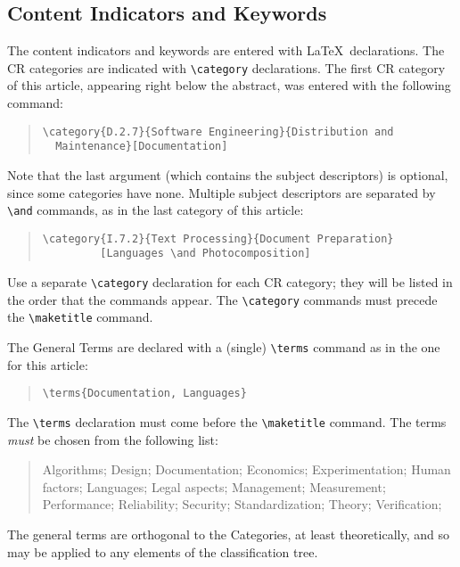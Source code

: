 \documentclass[hyperref]{acmtrans2e}
\begin{document}
\subsection{Content Indicators and Keywords}

The content indicators and keywords are entered with \LaTeX\ 
declarations.  The CR categories are indicated with \verb|\category|
declarations.  The first CR category of this article, appearing
right below the abstract, was entered with the following command:
\begin{quote}
\begin{verbatim}
\category{D.2.7}{Software Engineering}{Distribution and 
  Maintenance}[Documentation]
\end{verbatim}
\end{quote}
Note that the last argument (which contains the subject descriptors)
is optional, since some categories have none.  Multiple subject descriptors
are separated by \verb|\and| commands, as in the last category of
this article:
\begin{quote}
\begin{verbatim}
\category{I.7.2}{Text Processing}{Document Preparation}
         [Languages \and Photocomposition]
\end{verbatim}
\end{quote}
Use a separate \verb|\category| declaration for each CR category;
they will be listed in the order that the commands appear.  The
\verb|\category| commands must precede the \verb|\maketitle|
command.

The General Terms are declared with a (single) \verb|\terms|
command as in the one for this article:
\begin{quote}
\begin{verbatim}
\terms{Documentation, Languages}
\end{verbatim}
\end{quote}
The \verb|\terms| declaration must come before the \verb|\maketitle|
command.  The terms {\it must} be chosen from the following list:
\begin{quote}
Algorithms; 
Design; 
Documentation; 
Economics; 
Experimentation; 
Human factors; 
Languages; 
Legal aspects; 
Management; 
Measurement; 
Performance; 
Reliability; 
Security; 
Standardization; 
Theory; 
Verification; 
\end{quote}
The general terms are
orthogonal to the Categories, at least theoretically, and so
may be applied to any elements of the classification tree.
\end{document}

